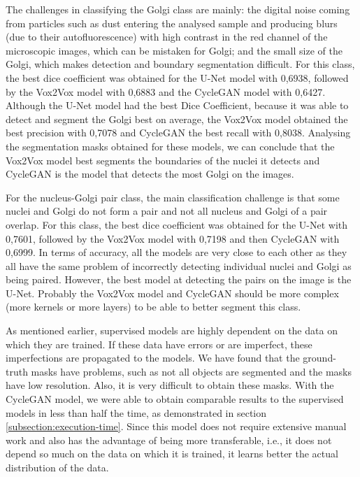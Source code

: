The challenges in classifying the Golgi class are mainly: the digital noise coming from particles such as dust entering the analysed sample and producing blurs (due to their autofluorescence) with high contrast in the red channel of the microscopic images, which can be mistaken for Golgi; and the small size of the Golgi, which makes detection and boundary segmentation difficult. For this class, the best dice coefficient was obtained for the U-Net model with 0,6938, followed by the Vox2Vox model with 0,6883 and the CycleGAN model with 0,6427. Although the U-Net model had the best Dice Coefficient, because it was able to detect and segment the Golgi best on average, the Vox2Vox model obtained the best precision with 0,7078 and CycleGAN the best recall with 0,8038. Analysing the segmentation masks obtained for these models, we can conclude that the Vox2Vox model best segments the boundaries of the nuclei it detects and CycleGAN is the model that detects the most Golgi on the images.



For the nucleus-Golgi pair class, the main classification challenge is that some nuclei and Golgi do not form a pair and not all nucleus and Golgi of a pair overlap. For this class, the best dice coefficient was obtained for the U-Net with 0,7601, followed by the Vox2Vox model with 0,7198 and then CycleGAN with 0,6999. In terms of accuracy, all the models are very close to each other as they all have the same problem of incorrectly detecting individual nuclei and Golgi as being paired. However, the best model at detecting the pairs on the image is the U-Net. Probably the Vox2Vox model and CycleGAN should be more complex (more kernels or more layers) to be able to better segment this class.

As mentioned earlier, supervised models are highly dependent on the data on which they are trained. If these data have errors or are imperfect, these imperfections are propagated to the models. We have found that the ground-truth masks have problems, such as not all objects are segmented and the masks have low resolution. Also, it is very difficult to obtain these masks. With the CycleGAN model, we were able to obtain comparable results to the supervised models in less than half the time, as demonstrated in section \ref{subsection:execution-time}. Since this model does not require extensive manual work and also has the advantage of being more transferable, i.e., it does not depend so much on the data on which it is trained, it learns better the actual distribution of the data.